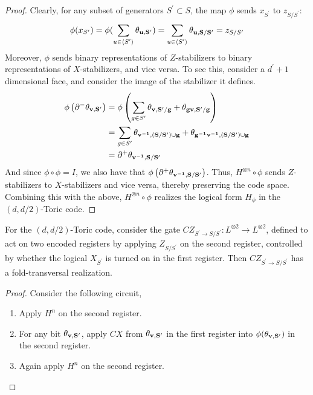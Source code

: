 \begin{proof}
  Clearly, for any subset of generators $S^{\prime} \subset S$, the map $\phi$ sends $x_{S^{\prime}}$ to $z_{S/S^{\prime}}$:
  \begin{equation*}
    \begin{split}
      \phi(x_{S^{\prime}}) = \phi(  \sum_{u \in \expval*{S^{\prime}} }\mathbf{\theta_{u ,S^{\prime}} }   ) =  \sum_{u \in \expval*{S^{\prime}} }\mathbf{\theta_{u ,S/S^{\prime}} } = z_{S/S^{\prime}}
    \end{split}
  \end{equation*}
Moreover, $\phi$ sends binary representations of $Z$-stabilizers to binary representations of $X$-stabilizers, and vice versa. To see this, consider a $d^{\prime}+1$ dimensional face, and consider the image of the stabilizer it defines.
  \begin{equation*}
    \begin{split}
      \phi \left( \partial^{-}  \mathbf{\theta_{v ,S^{\prime}} } \right) &=  \phi\left( \sum_{g\in S^{\prime}} \mathbf{\theta_{v ,S^{\prime}/g} } +  \mathbf{\theta_{gv ,S^{\prime}/g} }  \right) \\
      & = \sum_{g\in S^{\prime}} \mathbf{\theta_{v^{-1} ,(S/S^{\prime})\cup g} } +  \mathbf{\theta_{g^{-1}v^{-1} ,(S/S^{\prime})\cup g} }  \\ 
      &= \partial^{+} \mathbf{\theta_{v^{-1} ,S/S^{\prime}} }
    \end{split}
  \end{equation*}
And since $\phi \circ \phi = I$, we also have that $\phi\left( \partial^{+} \mathbf{\theta_{v^{-1} ,S/S^{\prime}} } \right)$. Thus, $H^{\otimes n} \circ \phi$ sends $Z$-stabilizers to $X$-stabilizers and vice versa, thereby preserving the code space. Combining this with the above, $H^{\otimes n} \circ \phi$ realizes the logical form $H_{\phi}$ in the $(d,d/2)$-Toric code.
\end{proof}

\begin{corollary}
For the $(d,d/2)$-Toric code, consider the gate $CZ_{S^{\prime}\rightarrow S/S^{\prime}} \colon L^{\otimes 2} \rightarrow L^{\otimes 2}$, defined to act on two encoded registers by applying $Z_{S/S^{\prime}}$ on the second register, controlled by whether the logical $X_{S^{\prime}}$ is turned on in the first register. Then $CZ_{S^{\prime}\rightarrow S/S^{\prime}}$  has a fold-transversal realization. 
\end{corollary}
\begin{proof}
Consider the following circuit, 
\begin{enumerate}
  \item Apply $H^{n}$ on the second register.  
  \item For any bit $\mathbf{\theta_{v ,S^{\prime}} }$, apply $CX$ from $\mathbf{\theta_{v ,S^{\prime}} }$ in the first register into $\phi(\mathbf{\theta_{v ,S^{\prime}} })$ in the second register.
  \item Again apply $H^{n}$ on the second register.  
\end{enumerate}
\end{proof}

